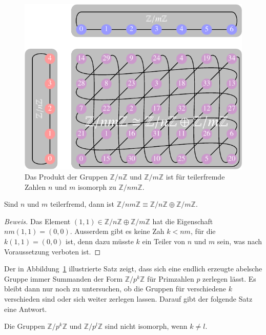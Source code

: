 \begin{figure}
\centering
\includegraphics{chapters/060-diskret/images/faktoren.pdf}
\caption{Das Produkt der Gruppen $\mathbb{Z}/n\mathbb{Z}$ und
$\mathbb{Z}/m\mathbb{Z}$ ist für teilerfremde Zahlen $n$ und $m$
isomorph zu $\mathbb{Z}/nm\mathbb{Z}$.
\label{buch:diskret:endlich:fig:produkt}}
\end{figure}

\begin{satz}
\label{buch:diskret:endlich:satz:teilerfremd}
Sind $n$ und $m$ teilerfremd, dann ist
$
\mathbb{Z}/nm\mathbb{Z}
\equiv
\mathbb{Z}/n\mathbb{Z} \oplus \mathbb{Z}/m\mathbb{Z}
$.
\end{satz}

\begin{proof}[Beweis]
Das Element $(1,1)\in \mathbb{Z}/n\mathbb{Z}\oplus\mathbb{Z}/m\mathbb{Z}$
hat die Eigenschaft $nm(1,1)=(0,0)$.
Ausserdem gibt es keine Zah $k<nm$, für die $k(1,1)=(0,0)$ ist, denn
dazu müsste $k$ ein Teiler von $n$ und $m$ sein, was nach Voraussetzung
verboten ist.
\end{proof}

Der in Abbildung~\ref{buch:diskret:endlich:fig:produkt} illustrierte
Satz zeigt, dass sich eine endlich erzeugte abelsche Gruppe immer
Summanden der Form $\mathbb{Z}/p^k\mathbb{Z}$ für Primzahlen $p$
zerlegen lässt.
Es bleibt dann nur noch zu untersuchen, ob die Gruppen für verschiedene
$k$ verschieden sind oder sich weiter zerlegen lassen.
Darauf gibt der folgende Satz eine Antwort.

\begin{satz}
\label{buch:diskret:endlich:satz:ppotenz}
Die Gruppen $\mathbb{Z}/p^k\mathbb{Z}$ und $\mathbb{Z}/p^l\mathbb{Z}$
sind nicht isomorph, wenn $k\ne l$.
\end{satz}

